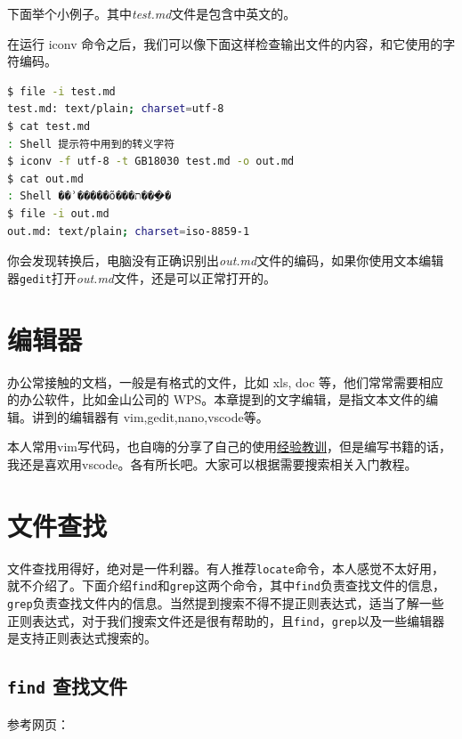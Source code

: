 \documentclass[doctor,openright,twoside]{sjtuthesis}
\newcommand{\passthrough}[1]{#1}
\theoremstyle{plain}
\theoremstyle{definition}
\theoremstyle{remark}
\theoremstyle{ocrenumbox}
\theoremstyle{plain}
\begin{document}
下面举个小例子。其中\emph{test.md}文件是包含中英文的。

在运行 iconv
命令之后，我们可以像下面这样检查输出文件的内容，和它使用的字符编码。

\begin{lstlisting}[language=bash]
$ file -i test.md
test.md: text/plain; charset=utf-8
$ cat test.md 
: Shell 提示符中用到的转义字符
$ iconv -f utf-8 -t GB18030 test.md -o out.md
$ cat out.md
: Shell ��ʾ�����õ���ת���ַ�
$ file -i out.md
out.md: text/plain; charset=iso-8859-1
\end{lstlisting}

你会发现转换后，电脑没有正确识别出\emph{out.md}文件的编码，如果你使用文本编辑器\passthrough{\lstinline!gedit!}打开\emph{out.md}文件，还是可以正常打开的。

\section{编辑器}

办公常接触的文档，一般是有格式的文件，比如 xls, doc
等，他们常常需要相应的办公软件，比如金山公司的
WPS。本章提到的文字编辑，是指文本文件的编辑。讲到的编辑器有
vim,gedit,nano,vscode等。

本人常用vim写代码，也自嗨的分享了自己的使用\href{https://my.oschina.net/bubifengyun/blog/163516}{经验教训}，但是编写书籍的话，我还是喜欢用vscode。各有所长吧。大家可以根据需要搜索相关入门教程。

\section{文件查找}

文件查找用得好，绝对是一件利器。有人推荐\passthrough{\lstinline!locate!}命令，本人感觉不太好用，就不介绍了。下面介绍\passthrough{\lstinline!find!}和\passthrough{\lstinline!grep!}这两个命令，其中\passthrough{\lstinline!find!}负责查找文件的信息，\passthrough{\lstinline!grep!}负责查找文件内的信息。当然提到搜索不得不提正则表达式，适当了解一些正则表达式，对于我们搜索文件还是很有帮助的，且\passthrough{\lstinline!find!}，\passthrough{\lstinline!grep!}以及一些编辑器是支持正则表达式搜索的。

\hypertarget{find-}{%
\subsection{\texorpdfstring{\texttt{find}
查找文件}{find 查找文件}}\label{find-}}

参考网页：
\end{document}
